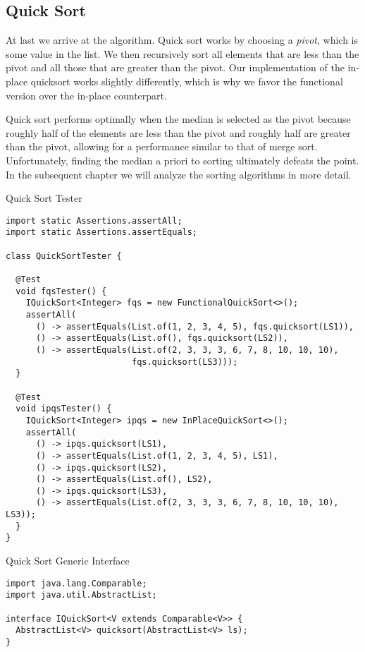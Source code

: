 \subsection*{Quick Sort}
At last we arrive at the  algorithm. Quick sort works by choosing a \textit{pivot}, which is some value in the list. We then recursively sort all elements that are less than the pivot and all those that are greater than the pivot. Our implementation of the in-place quicksort works slightly differently, which is why we favor the functional version over the in-place counterpart. 

Quick sort performs optimally when the median is selected as the pivot because roughly half of the elements are less than the pivot and roughly half are greater than the pivot, allowing for a performance similar to that of merge sort. Unfortunately, finding the median a priori to sorting ultimately defeats the point. In the subsequent chapter we will analyze the sorting algorithms in more detail.

\begin{cl}[]{Quick Sort Tester}
\begin{lstlisting}[language=MyJava]
import static Assertions.assertAll;
import static Assertions.assertEquals;

class QuickSortTester {

  @Test
  void fqsTester() {
    IQuickSort<Integer> fqs = new FunctionalQuickSort<>();
    assertAll(
      () -> assertEquals(List.of(1, 2, 3, 4, 5), fqs.quicksort(LS1)),
      () -> assertEquals(List.of(), fqs.quicksort(LS2)),
      () -> assertEquals(List.of(2, 3, 3, 3, 6, 7, 8, 10, 10, 10), 
                         fqs.quicksort(LS3)));
  }

  @Test
  void ipqsTester() {
    IQuickSort<Integer> ipqs = new InPlaceQuickSort<>();
    assertAll(
      () -> ipqs.quicksort(LS1),
      () -> assertEquals(List.of(1, 2, 3, 4, 5), LS1),
      () -> ipqs.quicksort(LS2),
      () -> assertEquals(List.of(), LS2),
      () -> ipqs.quicksort(LS3),
      () -> assertEquals(List.of(2, 3, 3, 3, 6, 7, 8, 10, 10, 10), LS3));
  }
}
\end{lstlisting}
\end{cl}

\begin{cl}[]{Quick Sort Generic Interface}
\begin{lstlisting}[language=MyJava]
import java.lang.Comparable;
import java.util.AbstractList;

interface IQuickSort<V extends Comparable<V>> {
  AbstractList<V> quicksort(AbstractList<V> ls);
}
\end{lstlisting}
\end{cl}

